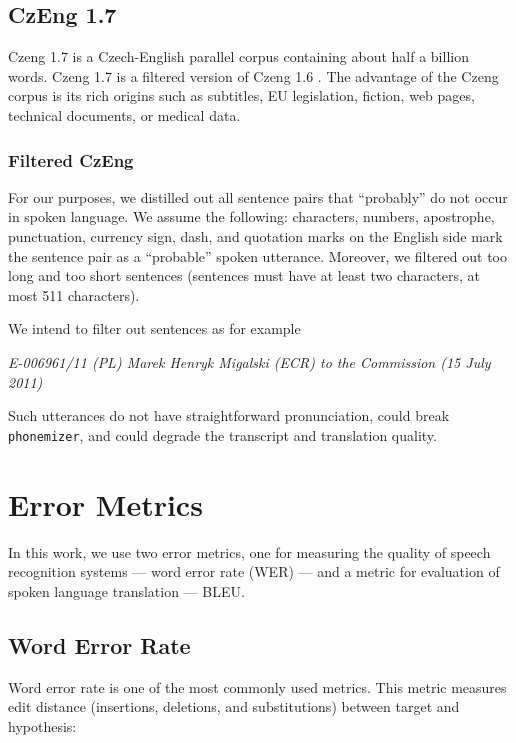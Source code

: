 \subsection{CzEng 1.7}
Czeng 1.7 is a Czech-English parallel corpus containing about half a billion words. Czeng 1.7 is a filtered version of Czeng 1.6 . The advantage of the Czeng corpus is its rich origins such as subtitles, EU legislation, fiction, web pages, technical documents, or medical data. 

\subsubsection{Filtered CzEng}
\label{filtered_czeng}
For our purposes, we distilled out all sentence pairs that ``probably'' do not occur in spoken language. We assume the following: characters, numbers, apostrophe, punctuation, currency sign, dash, and quotation marks on the English side mark the sentence pair as a ``probable'' spoken utterance. Moreover, we filtered out too long and too short sentences (sentences must have at least two characters, at most 511 characters).

We intend to filter out sentences as for example \\

\begin{minipage}{0.95\linewidth}
	\small\emph{E-006961/11 (PL) Marek Henryk Migalski (ECR) to the Commission (15 July 2011)}\\
\end{minipage}


Such utterances do not have straightforward pronunciation, could break \texttt{phone\-mi\-zer}, and could degrade the transcript and translation quality.



\pagebreak
\section{Error Metrics}
In this work, we use two error metrics, one for measuring the quality of speech recognition systems --- word error rate (WER) --- and a metric for evaluation of spoken language translation --- BLEU.

\subsection{Word Error Rate}
Word error rate is one of the most commonly used metrics. This metric measures edit distance (insertions, deletions, and substitutions) between target and hypothesis:


